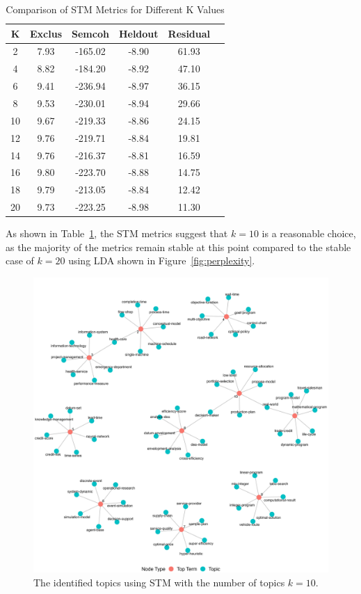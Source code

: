 \documentclass[9pt,twocolumn,twoside]{pnas-new}
\begin{document}
\begin{table}[!htbp]
\centering
\caption{Comparison of STM Metrics for Different K Values}
\begin{tabular}{cccccc}
\toprule
\textbf{K} & \textbf{Exclus} & \textbf{Semcoh} & \textbf{Heldout} & \textbf{Residual} \\
\midrule
2  & 7.93 & -165.02 & -8.90 & 61.93 \\
4  & 8.82 & -184.20 & -8.92 & 47.10 \\
6  & 9.41 & -236.94 & -8.97 & 36.15 \\
8  & 9.53 & -230.01 & -8.94 & 29.66 \\
10 & 9.67 & -219.33 & -8.86 & 24.15 \\
12 & 9.76 & -219.71 & -8.84 & 19.81 \\
14 & 9.76 & -216.37 & -8.81 & 16.59 \\
16 & 9.80 & -223.70 & -8.88 & 14.75 \\
18 & 9.79 & -213.05 & -8.84 & 12.42 \\
20 & 9.73 & -223.25 & -8.98 & 11.30 \\
\bottomrule
\end{tabular}
\label{tab:stm_metrics}
\end{table}

As shown in Table~\ref{tab:stm_metrics}, the STM metrics suggest that $k = 10$ is a reasonable choice, as the majority of the metrics remain stable at this point compared to the stable case of $k = 20$ using LDA shown in Figure~\ref{fig:perplexity}.

\begin{figure}[!tbhp]
\centering
\includegraphics[width=0.7\linewidth]{bag_words/topics_STM10.png}
\caption{The identified topics using STM with the number of topics $k = 10$.}
\label{fig:stmtopics}
\end{figure}
\end{document}
